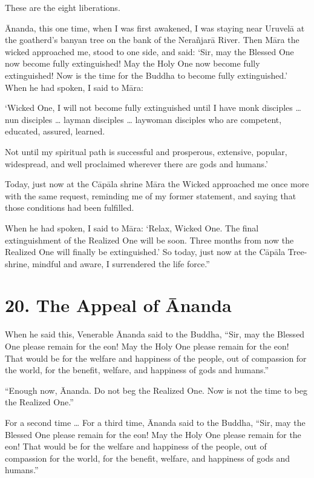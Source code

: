 \documentclass[12pt,openany]{book}%
\begin{document}
These are the eight liberations. 

Ānanda, this one time, when I was first awakened, I was staying near \textsanskrit{Uruvelā} at the goatherd’s banyan tree on the bank of the \textsanskrit{Nerañjarā} River. Then \textsanskrit{Māra} the wicked approached me, stood to one side, and said: ‘Sir, may the Blessed One now become fully extinguished! May the Holy One now become fully extinguished! Now is the time for the Buddha to become fully extinguished.’ When he had spoken, I said to \textsanskrit{Māra}: 

‘Wicked One, I will not become fully extinguished until I have monk disciples … nun disciples … layman disciples … laywoman disciples who are competent, educated, assured, learned. 

Not until my spiritual path is successful and prosperous, extensive, popular, widespread, and well proclaimed wherever there are gods and humans.’ 

Today, just now at the \textsanskrit{Cāpāla} shrine \textsanskrit{Māra} the Wicked approached me once more with the same request, reminding me of my former statement, and saying that those conditions had been fulfilled. 

When he had spoken, I said to \textsanskrit{Māra}: ‘Relax, Wicked One. The final extinguishment of the Realized One will be soon. Three months from now the Realized One will finally be extinguished.’ So today, just now at the \textsanskrit{Cāpāla} Tree-shrine, mindful and aware, I surrendered the life force.” 

\section*{20. The Appeal of Ānanda }

When he said this, Venerable Ānanda said to the Buddha, “Sir, may the Blessed One please remain for the eon! May the Holy One please remain for the eon! That would be for the welfare and happiness of the people, out of compassion for the world, for the benefit, welfare, and happiness of gods and humans.” 

“Enough now, Ānanda. Do not beg the Realized One. Now is not the time to beg the Realized One.” 

For a second time … For a third time, Ānanda said to the Buddha, “Sir, may the Blessed One please remain for the eon! May the Holy One please remain for the eon! That would be for the welfare and happiness of the people, out of compassion for the world, for the benefit, welfare, and happiness of gods and humans.” 
\end{document}
